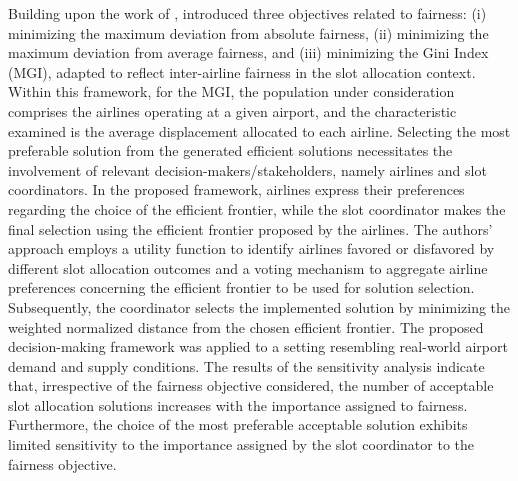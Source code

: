 Building upon the work of ,
 introduced three objectives related to
fairness: (i) minimizing the maximum deviation from absolute fairness, (ii)
minimizing the maximum deviation from average fairness, and (iii) minimizing the
Gini Index (MGI), adapted to reflect inter-airline fairness in the slot
allocation context.
%
Within this framework, for the MGI, the population under consideration comprises
the airlines operating at a given airport, and the characteristic examined is
the average displacement allocated to each airline.
%
Selecting the most preferable solution from the generated efficient solutions
necessitates the involvement of relevant decision-makers/stakeholders, namely
airlines and slot coordinators.
%
In the proposed framework, airlines express their preferences regarding the
choice of the efficient frontier, while the slot coordinator makes the final
selection using the efficient frontier proposed by the airlines.
%
The authors' approach employs a utility function to identify airlines favored or
disfavored by different slot allocation outcomes and a voting mechanism to
aggregate airline preferences concerning the efficient frontier to be used for
solution selection.
%
Subsequently, the coordinator selects the implemented solution by minimizing the
weighted normalized distance from the chosen efficient frontier.
%
The proposed decision-making framework was applied to a setting resembling
real-world airport demand and supply conditions.
%
The results of the sensitivity analysis indicate that, irrespective of the
fairness objective considered, the number of acceptable slot allocation
solutions increases with the importance assigned to fairness.
%
Furthermore, the choice of the most preferable acceptable solution exhibits
limited sensitivity to the importance assigned by the slot coordinator to the
fairness objective.



